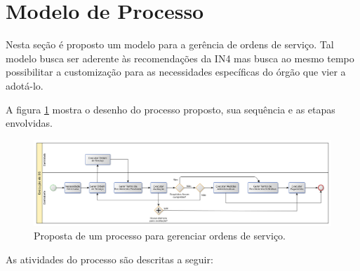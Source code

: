 \section{Modelo de Processo}

Nesta seção é proposto um modelo para a gerência de ordens de serviço. Tal
modelo busca ser aderente às recomendações da IN4 mas busca ao mesmo tempo
possibilitar a customização para as necessidades específicas do órgão que vier
a adotá-lo.

A figura \ref{fig:so_process} mostra o desenho do processo proposto, sua
sequência e as etapas envolvidas.

\begin{figure}[h]
  \includegraphics[width=1.0\textwidth,natwidth=500,natheight=150]{figures/so_process.png}
  \caption{Proposta de um processo para gerenciar ordens de serviço.}
  \label{fig:so_process}
\end{figure}

As atividades do processo são descritas a seguir:

